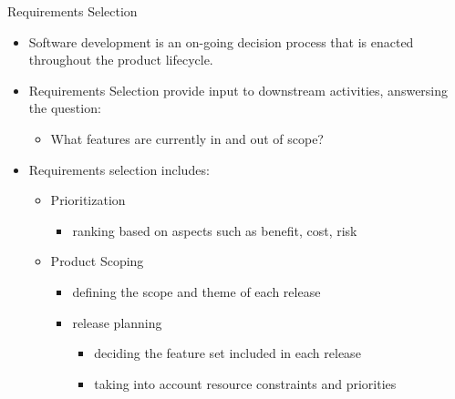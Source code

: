 \begin{Slide}{Requirements Selection}
\begin{itemize}
\item Software development is an on-going decision process that is enacted throughout the product lifecycle.
\item Requirements Selection provide input to downstream activities, answersing the question: 
\begin{itemize}
\item What features are currently in and out of scope?
\end{itemize}
\item Requirements selection includes:
\begin{itemize}
\item Prioritization 
\begin{itemize}
\item ranking based on aspects such as benefit, cost, risk
\end{itemize}
\item Product Scoping
\begin{itemize}
\item defining the scope and theme of each release
\item release planning 
\begin{itemize}
\item deciding the feature set included in each release
\item taking into account resource constraints and priorities


\end{itemize}
\end{itemize}
\end{itemize}
\end{itemize}
\end{Slide}